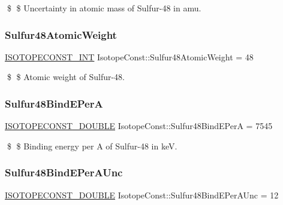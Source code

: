 \$ \$ Uncertainty in atomic mass of Sulfur-\/48 in amu. \mbox{\label{group___isotope_const-_sulfur-_s48_gadcdc6ca15433da68cb4363980fbd0546}} 
\subsubsection{\texorpdfstring{Sulfur48\+Atomic\+Weight}{Sulfur48AtomicWeight}}
{\footnotesize\ttfamily \mbox{\hyperlink{group___isotope_const-_macros_ga5f18360b3e99483a35c32d789e62621c}{I\+S\+O\+T\+O\+P\+E\+C\+O\+N\+S\+T\+\_\+\+I\+NT}} Isotope\+Const\+::\+Sulfur48\+Atomic\+Weight = 48}

\$ \$ Atomic weight of Sulfur-\/48. \mbox{\label{group___isotope_const-_sulfur-_s48_gaaf45d3b5ad477d46430af2be9d5d5f6c}} 
\subsubsection{\texorpdfstring{Sulfur48\+Bind\+E\+PerA}{Sulfur48BindEPerA}}
{\footnotesize\ttfamily \mbox{\hyperlink{group___isotope_const-_macros_ga8f45a7272ce02c0b4c65c44636ed719a}{I\+S\+O\+T\+O\+P\+E\+C\+O\+N\+S\+T\+\_\+\+D\+O\+U\+B\+LE}} Isotope\+Const\+::\+Sulfur48\+Bind\+E\+PerA = 7545}

\$ \$ Binding energy per A of Sulfur-\/48 in keV. \mbox{\label{group___isotope_const-_sulfur-_s48_ga157135c0b7bc8d901ca0187e978e5fcd}} 
\subsubsection{\texorpdfstring{Sulfur48\+Bind\+E\+Per\+A\+Unc}{Sulfur48BindEPerAUnc}}
{\footnotesize\ttfamily \mbox{\hyperlink{group___isotope_const-_macros_ga8f45a7272ce02c0b4c65c44636ed719a}{I\+S\+O\+T\+O\+P\+E\+C\+O\+N\+S\+T\+\_\+\+D\+O\+U\+B\+LE}} Isotope\+Const\+::\+Sulfur48\+Bind\+E\+Per\+A\+Unc = 12}

